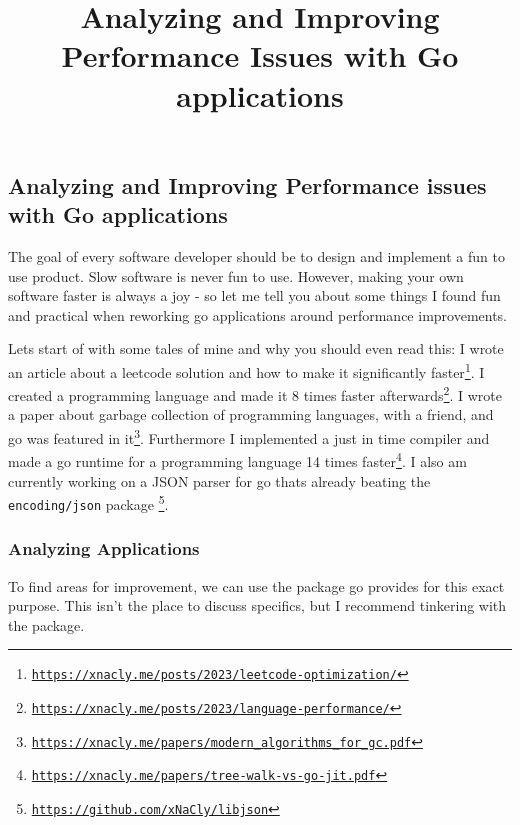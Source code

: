 

\title{Analyzing and Improving Performance Issues with Go applications}


    \subsection*{Analyzing and Improving Performance issues with Go applications}

    The goal of every software developer should be to design and implement a
    fun to use product. Slow software is never fun to use. However, making your
    own software faster is always a joy - so let me tell you about some things
    I found fun and practical when reworking go applications around performance
    improvements.

    Lets start of with some tales of mine and why you should even read this: I
    wrote an article about a leetcode solution and how to make it significantly
    faster\footnote{\href{https://xnacly.me/posts/2023/leetcode-optimization/}{\texttt{https://xnacly.me/posts/2023/leetcode-optimization/}}}.
    I created a programming language and made it 8 times faster
    afterwards\footnote{\href{https://xnacly.me/posts/2023/language-performance/}{\texttt{https://xnacly.me/posts/2023/language-performance/}}}.
    I wrote a paper about garbage collection of programming languages, with a
    friend, and go was featured in
    it\footnote{\href{https://xnacly.me/papers/modern_algorithms_for_gc.pdf}{\texttt{https://xnacly.me/papers/modern\_algorithms\_for\_gc.pdf}}}.
    Furthermore I implemented a just in time compiler and made a go runtime for
    a programming language 14 times
    faster\footnote{\href{https://xnacly.me/papers/tree-walk-vs-go-jit.pdf}{\texttt{https://xnacly.me/papers/tree-walk-vs-go-jit.pdf}}}.
    I also am currently working on a JSON parser for go thats already beating
    the \texttt{encoding/json} package
    \footnote{\href{https://github.com/xNaCly/libjson}{\texttt{https://github.com/xNaCly/libjson}}}.

    \subsubsection*{Analyzing Applications}

    To find areas for improvement, we can use the package go provides for this
    exact purpose. This isn't the place to discuss specifics, but I recommend
    tinkering with the package.

